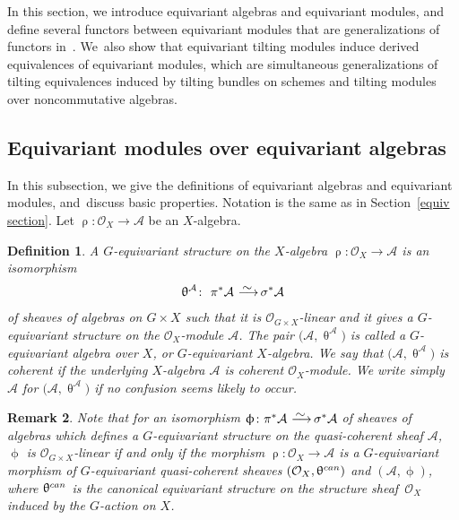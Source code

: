 \documentclass[11pt]{article}
\numberwithin{equation}{section}
\newtheorem{dfn}{Definition}[section]
\newtheorem{rem}[dfn]{Remark}
\numberwithin{equation}{section}
\newcommand{\cA}{\mathcal{A}}
\newcommand{\cO}{\mathcal{O}}
\newcommand{\simto}{\,\,\,\,\raisebox{4pt}{$\sim$}{\kern -1.1em \longrightarrow}\,}
\begin{document}
In this section, we introduce equivariant algebras and equivariant modules, and define seve\-ral functors between equivariant modules that are generalizations of functors in~\cite[Section~2]{bfk}. We~also show that equivariant tilting modules induce derived equivalences of equivariant modules, which are simultaneous generalizations of tilting equivalences induced by tilting bundles on schemes and tilting modules over noncommutative algebras.

\subsection{Equivariant modules over equivariant algebras}

In this subsection, we give the definitions of equivariant algebras and equivariant modules, and~dis\-cuss basic properties.
Notation is the same as in Section~\ref{equiv section}. Let $\uprho\colon \cO_X\to \cA$ be an $X$-algebra.

\begin{dfn}
A {\it $G$-equivariant structure} on the $X$-algebra $\uprho\colon \cO_X\to\cA$ is an isomorphism
\begin{gather*}
\uptheta^{\cA}\colon\ \pi^*\cA\simto \sigma^*\cA
\end{gather*}
 of sheaves of algebras on $G\times X$
such that it is $\cO_{G\times X}$-linear and it gives a $G$-equivariant structure on the $\cO_X$-module $\cA$. The pair $\big(\cA,\uptheta^{\cA}\big)$ is called a {\it $G$-equivariant algebra over $X$}, or {\it $G$-equivariant $X$-algebra}. We say that $\big(\cA,\uptheta^{\cA}\big)$ is {\it coherent} if the underlying $X$-algebra $\cA$ is coherent $\cO_X$-module. We write simply $\cA$ for $\big(\cA,\uptheta^{\cA}\big)$ if no confusion seems likely to occur.
\end{dfn}

\begin{rem}\label{linearity}
Note that for an isomorphism $\upphi \colon \pi^*\cA\simto \sigma^*\cA$ of sheaves of algebras which defines a $G$-equivariant structure on the quasi-coherent sheaf $\cA$, $\upphi$ is $\cO_{G\times X}$-linear if and only if the morphism $\uprho\colon \cO_X\to \cA$ is a $G$-equivariant morphism of $G$-equivariant quasi-coherent sheaves $(\cO_X,\uptheta^{\rm can})$ and $(\cA,\upphi)$, where $\uptheta^{\rm can}$ is the canonical equivariant structure on the structure sheaf~$\cO_X$ induced by the $G$-action on $X$.
\end{rem}
\end{document}
